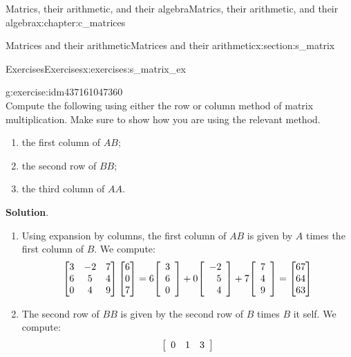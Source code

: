 \documentclass[oneside,10pt,]{book}
\newcommand{\blocktitlefont}{\relax}
\numberwithin{equation}{section}
\newenvironment{amatrix}[1][ccc|c]{\left[\begin{array}{#1}}{\end{array}\right]}
\newcommand{\amp}{&}
\begin{document}
\begin{chapterptx}{Matrics, their arithmetic, and their algebra}{}{Matrics, their arithmetic, and their algebra}{}{}{x:chapter:c_matrices}
\begin{sectionptx}{Matrices and their arithmetic}{}{Matrices and their arithmetic}{}{}{x:section:s_matrix}
\begin{exercises-subsection-numberless}{Exercises}{}{Exercises}{}{}{x:exercises:s_matrix_ex}
\begin{divisionexercise}{3}{}{}{g:exercise:idm437161047360}
\begin{equation*}
\end{equation*}
Compute the following using either the row or column method of matrix multiplication. Make sure to show how you are using the relevant method.%
\begin{enumerate}[marker=(\alph*)]
\item{}the first column of \(AB\);%
\item{}the second row of \(BB\);%
\item{}the third column of \(AA\).%
\end{enumerate}
%
\par\smallskip%
\noindent\textbf{\blocktitlefont Solution}.\hypertarget{g:solution:idm437161042256}{}\quad{}%
\begin{enumerate}[marker=(\alph*)]
\item{}Using expansion by columns, the first column of \(AB\) is given by \(A\) times the first column of \(B\). We compute:%
\begin{equation*}
\begin{bmatrix}3\amp -2\amp 7\\ 6\amp 5\amp 4\\ 0\amp 4\amp 9 \end{bmatrix} \begin{bmatrix}6\\ 0\\ 7 \end{bmatrix} = 6 \begin{amatrix}[r]3 \\ 6 \\ 0  \end{amatrix}+0 \begin{amatrix}[r]-2 \\ 5 \\ 4  \end{amatrix}+7\begin{amatrix}[r]7 \\ 4 \\ 9  \end{amatrix}= \begin{bmatrix}67\\ 64\\ 63 \end{bmatrix}
\end{equation*}
%
\item{}The second row of \(BB\) is given by the second row of \(B\) times \(B\) it self. We compute:%
\begin{align*}
\begin{amatrix}[rrr]0\amp 1\amp 3\end{amatrix}

\end{align*}
\end{enumerate}
\end{divisionexercise}
\end{exercises-subsection-numberless}
\end{sectionptx}
\end{chapterptx}
\end{document}
